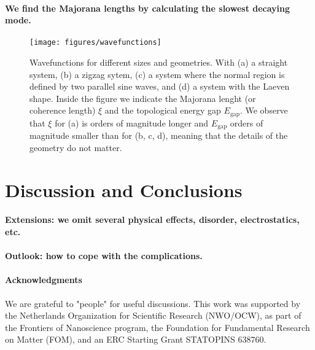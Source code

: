 \documentclass[english, twocolumn, 10pt, aps, superscriptaddress, floatfix, prb, citeautoscript]{revtex4-1}
\renewcommand{\comment}[2]{#2}
\renewcommand{\comment}{\paragraph}
\begin{document}
\comment{We find the Majorana lengths by calculating the slowest decaying mode.}

\begin{figure}[!htb]
\texttt{[image: figures/wavefunctions]}
\caption{Wavefunctions for different sizes and geometries.
With (a) a straight system, (b) a zigzag sytem, (c) a system where the normal region is defined by two parallel sine waves, and (d) a system with the Laeven shape.
Inside the figure we indicate the Majorana lenght (or coherence length) $\xi$ and the topological energy gap $E_\textrm{gap}.$
We observe that $\xi$ for (a) is orders of magnitude longer and $E_\textrm{gap}$ orders of magnitude smaller than for (b, c, d), meaning that the details of the geometry do not matter.
\label{fig:wavefunctions}}
\end{figure}


\section{Discussion and Conclusions}

\comment{Extensions: we omit several physical effects, disorder, electrostatics, etc.}

\comment{Outlook: how to cope with the complications.}

\comment{Acknowledgments}

We are grateful to "people" for useful discussions.
This work was supported by the Netherlands Organization for Scientific Research (NWO/OCW), as part of the Frontiers of Nanoscience program, the Foundation for Fundamental Research on Matter (FOM), and an ERC Starting Grant STATOPINS 638760.



\end{document}
